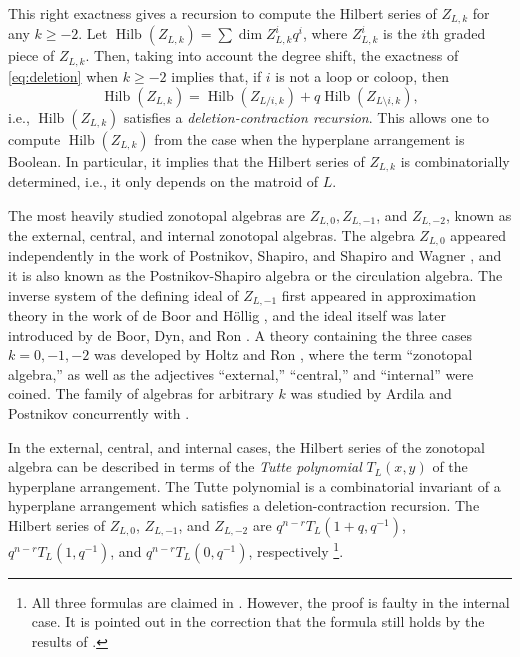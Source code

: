 \documentclass{amsart}
\theoremstyle{definition}
\begin{document}
This right exactness gives a recursion to compute the Hilbert series of $Z_{L, k}$ for any $k \ge -2$. Let $\operatorname{Hilb}(Z_{L, k}) = \sum \dim Z_{L,k}^i q^i$, where $Z_{L,k}^i$ is the $i$th graded piece of $Z_{L,k}$. Then, taking into account the degree shift, the exactness of \eqref{eq:deletion} when $k \ge -2$ implies that, if $i$ is not a loop or coloop, then
$$\operatorname{Hilb}(Z_{L, k}) = \operatorname{Hilb}(Z_{L/i, k}) + q \operatorname{Hilb}(Z_{L \setminus i, k}),$$
i.e., $\operatorname{Hilb}(Z_{L, k})$ satisfies a \emph{deletion-contraction recursion}.
This allows one to compute $\operatorname{Hilb}(Z_{L,k})$ from the case when the hyperplane arrangement is Boolean.
In particular, it implies that the Hilbert series of $Z_{L,k}$ is combinatorially determined, i.e., it only depends on the matroid of $L$. 


The most heavily studied zonotopal algebras are $Z_{L, 0}, Z_{L,-1}$, 
and $Z_{L,-2}$, known as the external, central, and internal zonotopal 
algebras. 
The algebra $Z_{L,0}$ appeared independently in 
the work of Postnikov, Shapiro, and Shapiro \cite{PSS} and 
Wagner \cite{Wagner, wagnerAlgebrasRelatedMatroids1999}, 
and it is also known as the Postnikov-Shapiro 
algebra or the circulation algebra. The 
inverse system of the 
defining ideal of $Z_{L,-1}$ first appeared in approximation theory in 
the work of de Boor and H\"ollig \cite{deboorBsplinesParallelepipeds1982}, and the ideal itself was later 
introduced by de Boor, Dyn, and Ron \cite{deboorTwoPolynomialSpaces1991}. A 
theory containing the three cases $k=0,-1,-2$ was developed by Holtz and Ron 
\cite{HoltzRon}, where the term ``zonotopal algebra,'' as well as the 
adjectives ``external,'' ``central,'' and ``internal'' were coined. The family 
of algebras for arbitrary $k$ was studied by Ardila and Postnikov 
\cite{ArdilaPostnikov} concurrently with 
\cite{HoltzRon}. 

In the external, central, and internal cases, the Hilbert series of the 
zonotopal algebra can be described in terms of the \emph{Tutte 
polynomial} $T_L(x,y)$ of the hyperplane arrangement. The Tutte 
polynomial is a combinatorial invariant of a hyperplane arrangement 
which satisfies a deletion-contraction recursion. The Hilbert series of 
$Z_{L, 0}$, $Z_{L, -1}$, and $Z_{L, -2}$ are $q^{n-r} T_L(1 + q, 
q^{-1})$, $q^{n-r}T_L(1, q^{-1})$, and $q^{n-r}T_L(0, q^{-1})$, 
respectively \cite{ArdilaPostnikov, HoltzRon}\footnote{All three 
    formulas are claimed in {\cite[Corollary 4.13, Corollary 
    4.14, and Corollary 4.15]{ArdilaPostnikov}}. However, the 
proof is faulty in the internal case. It is pointed out in 
the correction {\cite{APCorrection}} that 
the formula still holds by the results of 
{\cite{HoltzRon}}.}.
\end{document}
